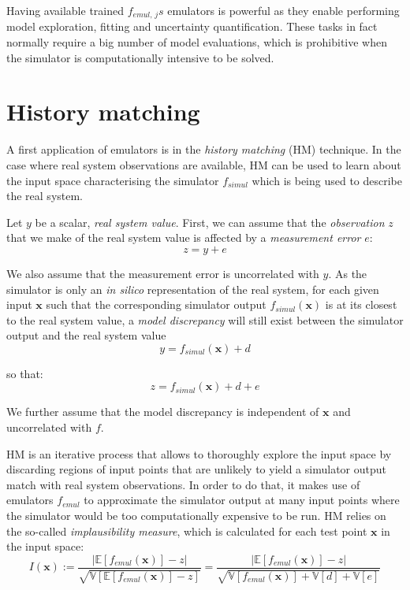\noindent
Having available trained $f_{emul,\,j}s$ emulators is powerful as they enable performing model exploration, fitting and uncertainty quantification. These tasks in fact normally require a big number of model evaluations, which is prohibitive when the simulator is computationally intensive to be solved.


%
%
%
\section{History matching}\label{sec:ch3historymatching}
A first application of emulators is in the \textit{history matching} (\acs{HM}) technique. In the case where real system observations are available, HM can be used to learn about the input space characterising the simulator $f_{simul}$ which is being used to describe the real system.

\vspace{0.2cm}
Let $y$ be a scalar, \textit{real system value}. First, we can assume that the \textit{observation} $z$ that we make of the real system value is affected by a \textit{measurement error} $e$:
%
\begin{equation}
z = y + e
\end{equation}

\noindent
We also assume that the measurement error is uncorrelated with $y$. As the simulator is only an \textit{in silico} representation of the real system, for each given input $\mathbf{x}$ such that the corresponding simulator output $f_{simul}(\mathbf{x})$ is at its closest to the real system value, a \textit{model discrepancy} will still exist between the simulator output and the real system value
%
\begin{equation}
y = f_{simul}(\mathbf{x}) + d
\end{equation}

\noindent
so that:
%
\begin{equation}
z = f_{simul}(\mathbf{x}) + d + e
\end{equation}

\noindent
We further assume that the model discrepancy is independent of $\mathbf{x}$ and uncorrelated with $f$.

\vspace{0.2cm}
HM is an iterative process that allows to thoroughly explore the input space by discarding regions of input points that are unlikely to yield a simulator output match with real system observations. In order to do that, it makes use of emulators $f_{emul}$ to approximate the simulator output at many input points where the simulator would be too computationally expensive to be run. HM relies on the so-called \textit{implausibility measure}, which is calculated for each test point $\mathbf{x}$ in the input space:
%
\begin{equation}\label{eq:implmeasure}
    I(\mathbf{x}) := \frac{\lvert\mathbb{E}[f_{emul}(\mathbf{x})]-z\rvert}{\sqrt{\mathbb{V}[\mathbb{E}[f_{emul}(\mathbf{x})]-z]}} = \frac{\lvert\mathbb{E}[f_{emul}(\mathbf{x})]-z\rvert}{\sqrt{\mathbb{V}[f_{emul}(\mathbf{x})] + \mathbb{V}[d] + \mathbb{V}[e]}}
\end{equation}

